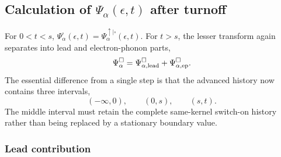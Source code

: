 \documentclass[
 reprint,
 superscriptaddress,
 amsmath,amssymb,
 aps,prb,
 longbibliography,
 floatfix
]{revtex4-2}
\newcommand{\ep}{\mathrm{ep}}
\begin{document}
\subsection{Calculation of $\Psi_\alpha(\epsilon,t)$ after turnoff}
\label{sec:square-Psi}

For $0<t<s$, $
\Psi_\alpha^\square(\epsilon,t)
=
\Psi_\alpha^{\uparrow|\square}(\epsilon,t)$. For $t>s$, the lesser transform again separates into lead and electron-phonon parts,
\begin{equation*}
\Psi_\alpha^\square
=
\Psi_{\alpha,\rm lead}^\square
+
\Psi_{\alpha,\ep}^\square.
\end{equation*}
The essential difference from a single step is that the advanced history now contains three intervals,
\begin{equation*}
(-\infty,0),
\qquad
(0,s),
\qquad
(s,t).
\end{equation*}
The middle interval must retain the complete same-kernel switch-on history rather than being replaced by a stationary boundary value.

\subsubsection{Lead contribution}
\end{document}
